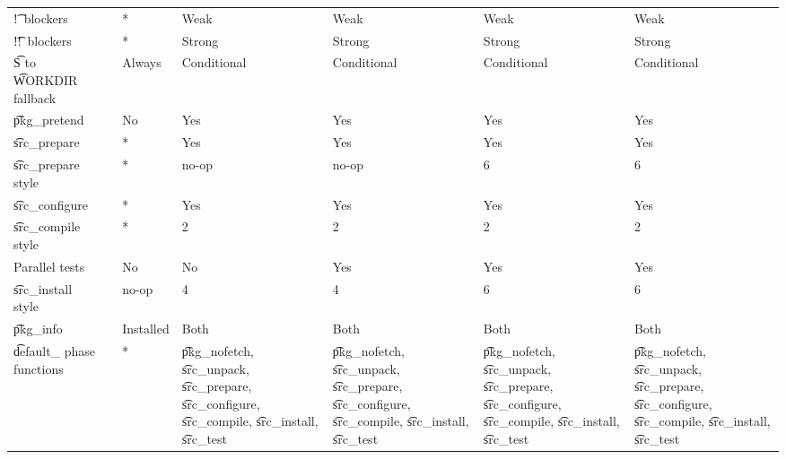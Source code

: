 \begin{landscape}
\begin{longtable}{llP{7.5em}P{7.5em}P{7.5em}P{7.5em}P{7.5em}}
\t{!}\ blockers &  &
    * & Weak & Weak & Weak & Weak \\

\t{!!}\ blockers &  &
    * & Strong & Strong & Strong & Strong \\

\t{S} to \t{WORKDIR} fallback &  &
    Always & Conditional & Conditional & Conditional & Conditional \\

\t{pkg_pretend} &  &
    No & Yes & Yes & Yes & Yes \\

\t{src_prepare} &  &
    * & Yes & Yes & Yes & Yes \\

\t{src_prepare} style &  &
    * & no-op & no-op & 6 & 6 \\

\t{src_configure} &  &
    * & Yes & Yes & Yes & Yes \\

\t{src_compile} style &  &
    * & 2 & 2 & 2 & 2 \\

Parallel tests &  &
    No & No & Yes & Yes & Yes \\

\t{src_install} style &  &
    no-op & 4 & 4 & 6 & 6 \\

\t{pkg_info} &  &
    Installed & Both & Both & Both & Both \\

\t{default_} phase functions &  &
    * &
    \t{pkg_nofetch}, \t{src_unpack}, \t{src_prepare}, \t{src_configure},
        \t{src_compile}, \t{src_install}, \t{src_test} &
    \t{pkg_nofetch}, \t{src_unpack}, \t{src_prepare}, \t{src_configure},
        \t{src_compile}, \t{src_install}, \t{src_test} &
    \t{pkg_nofetch}, \t{src_unpack}, \t{src_prepare}, \t{src_configure},
        \t{src_compile}, \t{src_install}, \t{src_test} &
    \t{pkg_nofetch}, \t{src_unpack}, \t{src_prepare}, \t{src_configure},
        \t{src_compile}, \t{src_install}, \t{src_test} \\


\end{longtable}
\end{landscape}
